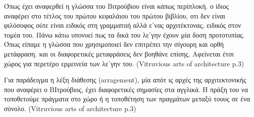   Όπως έχει αναφερθεί η γλώσσα του Βιτρούβιου είναι κάπως περίπλοκή. ο ίδιος 
  αναφέρει στο τέτλος του πρώτου κεφαλάιου του πρώτου βιβλίου, οτι δεν είναι 
  φιλόσοφος ούτε είναι ειδικός στη γραμματιιή αλλά ε΄νας αρχιτέκτονας, ειδικός 
  στον τομέα του. Πάνω κάτω υπονοεί πως τα δικά του λε΄γην έχουν μία δοση 
  προτοτυπίας. Όπως είπαμε η γλώσσα που χρησιμοποιεί δεν επιτρέπει την σίγουρη 
  και ορθή μετάφραση. και οι διαφορετικές μεταφράσεις δεν βοηθάνε επίσης. 
  Αφείνεται έτσι χώρος για περετέρο ερμεινεία των λε΄γην του. (Vitruvious arts 
  of architecture p.3)
  
  Για παράδειγμα η λέξη διάθεσης (arragement), μία απότ ις αρχές της αρχιτεκτονικής που αναφέρει ο ΒΙτρούβιος, έχει διαφορετικές σημασίες στα αγγλικά. Η πράξη του να τοποθετούμε πράγματα στο χώρο ή η τοποθέτηση των πραγμάτων μεταξύ τουυς σε ένα σύνολο. (Vitruvious arts of architecture p.3) 